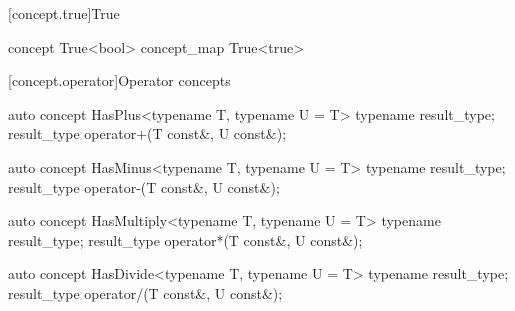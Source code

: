 \documentclass[american,twoside]{book}
\begin{document}
[concept.true]{True}

\begin{itemdecl}
concept True<bool> { }
concept_map True<true> { }
\end{itemdecl}

\begin{itemdescr}
\pnum
{}

\pnum
{}
\end{itemdescr}

[concept.operator]{Operator concepts}
\begin{itemdecl}
auto concept HasPlus<typename T, typename U = T> {
  typename result_type;
  result_type operator+(T const&, U const&);
}
\end{itemdecl}

\begin{itemdescr}
\pnum
{}
\end{itemdescr}

\begin{itemdecl}
auto concept HasMinus<typename T, typename U = T> {
  typename result_type;
  result_type operator-(T const&, U const&);
}
\end{itemdecl}

\begin{itemdescr}
\pnum
{}
\end{itemdescr}

\begin{itemdecl}
auto concept HasMultiply<typename T, typename U = T> {
  typename result_type;
  result_type operator*(T const&, U const&);
}
\end{itemdecl}

\begin{itemdescr}
\pnum
{}
\end{itemdescr}

\begin{itemdecl}
auto concept HasDivide<typename T, typename U = T> {
  typename result_type;
  result_type operator/(T const&, U const&);
}
\end{itemdecl}
\end{document}
